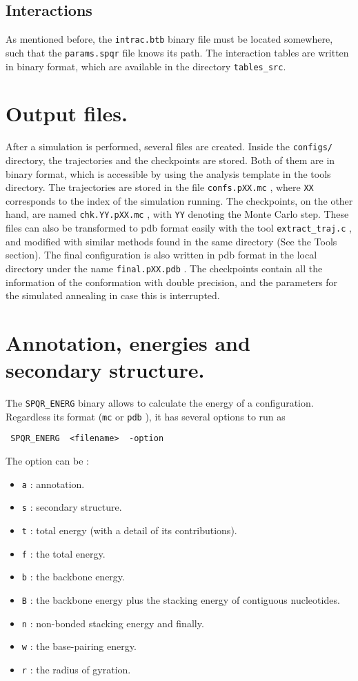 \documentclass{article}
\begin{document}
\subsection{Interactions}

As mentioned before, the \texttt{intrac.btb}  binary file must be located somewhere, such that the \texttt{params.spqr}  file knows its path. The interaction tables are written in binary format, which are available in the directory \texttt{tables\_src}.

\section{Output files.}

After a simulation is performed, several files are created. Inside the \texttt{configs/}  directory, the trajectories and the checkpoints are stored. Both of them are in binary format, which is accessible by using the analysis template in the tools directory. The trajectories are stored in the file \texttt{confs.pXX.mc} , where \texttt{XX} corresponds to the index of the simulation running. The checkpoints, on the other hand, are named \texttt{chk.YY.pXX.mc} , with \texttt{YY} denoting the Monte Carlo step. These files can also be transformed to pdb format easily with the tool \texttt{extract\_traj.c} , and modified with similar methods found in the same directory (See the Tools section). The final configuration is also written in pdb format in the local directory under the name \texttt{final.pXX.pdb} . The checkpoints contain all the information of the conformation with double precision, and the parameters for the simulated annealing in case this is interrupted.

\section{Annotation, energies and secondary structure.}

The \texttt{SPQR\_ENERG} binary allows to calculate the energy of a configuration. Regardless its format (\texttt{mc}  or \texttt{pdb} ), it has several options to run as
\begin{verbatim}
 SPQR_ENERG  <filename>  -option
\end{verbatim}

The option can be :
\begin{itemize}
\item \texttt a : annotation.
\item \texttt s : secondary structure.
\item \texttt t : total energy (with a detail of its contributions).
\item \texttt f : the total energy.
\item \texttt b : the backbone energy.
\item \texttt B : the backbone energy plus the stacking energy of contiguous nucleotides.
\item \texttt n : non-bonded stacking energy and finally.
\item \texttt w : the base-pairing energy. 
\item \texttt r : the radius of gyration.
\end{itemize}
\end{document}
